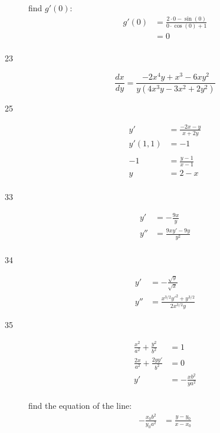 \documentclass[letterpaper]{exam}
\begin{document}
\begin{description}
      find $g'(0)$:
      \begin{align*}
        g'(0) & = \frac{2 \cdot 0 - \sin (0) }{0 \cdot \cos (0) + 1} \\
              & = \boxed{ 0 } \\
      \end{align*}

    \item[23] 
      \[
        \frac{dx}{dy} = \frac{-2 x^4 y+x^3-6 x y^2}{y \left(4 x^3 y-3 x^2+2 y^2\right)}
      \]

    \item[25] 
      \begin{align*}
        y'       & = \frac{ - 2x - y}{x + 2 y} \\
        y'(1, 1) & = -1 \\
        \\
        -1       & = \frac{y - 1}{x - 1} \\
        y        & = 2 - x \\
      \end{align*}

    \item[33]
      \begin{align*}
        y'  & = - \frac{9x}{y} \\
        y'' & = \frac{9xy' - 9y}{y^2} \\
      \end{align*}

    \item[34] 
      \begin{align*}
        y'  & = - \frac{\sqrt{y}}{\sqrt{x}} \\
        y'' & = \frac{x^{3/2} y'^2 + y^{3/2}}{2x^{3/2} y}
      \end{align*}

    \item[35] 
      \begin{align*}
        \frac{x^2}{a^2} + \frac{y^2}{b^2} & = 1 \\
        \frac{2x}{a^2} + \frac{2yy'}{b^2} & = 0 \\
        y'                                & = - \frac{xb^2}{ya^2} \\
      \end{align*}


      find the equation of the line:
      \begin{align*}
        - \frac{x_0 b^2}{y_0 a^2} &= \frac{y - y_0}{x - x_0} \\
      \end{align*}


\end{description}
\end{document}
